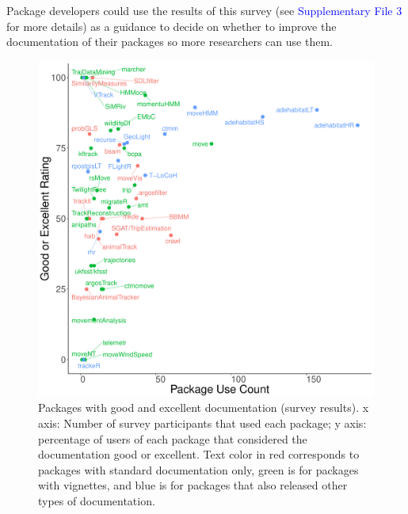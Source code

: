 \documentclass[a4paper,12pt]{article}
\begin{document}
Package developers could use the results of this survey (see \textcolor{blue}{Supplementary File 3} for more details) as a guidance to decide on whether to improve the documentation of their packages so more researchers can use them. 

\begin{figure}
        \centering
        \includegraphics[width=1\textwidth]{./mes_images/doc_vs_participants_noleg.pdf}
        \caption{\label{fig:DocParticipants} Packages with good and excellent documentation (survey results). %
          x axis: Number of survey participants that used each package; %
          y axis: percentage of users of each package that considered the documentation good or excellent. Text color in red corresponds to packages with standard documentation only, green is for packages with vignettes, and blue is for packages that also released other types of documentation.} %
\end{figure}
\end{document}
